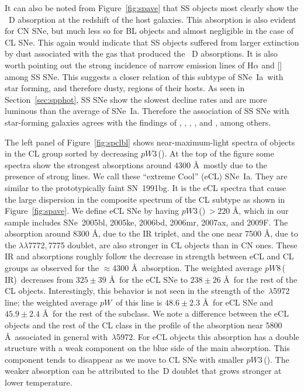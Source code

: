 \documentclass[apj]{emulateapj-rtx4}
\newcommand{\ew}{$pW$}
\newcommand{\pwthree}{$pW$3\,(\ion{Mg}{2})}
\newcommand{\pweight}{$pW$8\,(\ion{Ca}{2}\,IR)}
\newcommand{\sneia}{SNe~Ia}
\begin{document}
It can also be noted from Figure~\ref{fig:spave} that SS objects most
clearly show the ~D absorption at the redshift of the host
galaxies. This absorption is also evident for CN SNe, but much less so for BL
objects and almost negligible in the case of CL SNe. This again would
indicate that SS objects suffered from larger extinction by dust
associated with the gas that produced the ~D absorptions.
It is also worth pointing out the strong incidence of narrow emission
lines of H$\alpha$ and [] among SS SNe. This suggests a
closer relation of this subtype of \sneia\ with star forming,
and therefore dusty, regions of their hosts. As seen in
Section~\ref{sec:spphot}, SS SNe show the slowest decline rates and
are more luminous than the average of \sneia. Therefore the
association of SS SNe with star-forming galaxies agrees with the
findings of \citet{hamuy96}, \citet{howell01}, \citet{gallagher08},
\citet{hicken09}, \citet{sullivan10} and \citet{brandt11}, among others.

The left panel of Figure~\ref{fig:spclbl} shows near-maximum-light
spectra of objects in the CL group sorted by decreasing \pwthree. At the
top of the figure some spectra show the strongest absorptions around
4300 \AA\ mostly due to the presence of strong  lines.
We call these ``extreme Cool'' (eCL) \sneia. They are similar to
the prototypically faint SN~1991bg. It is the eCL spectra that cause
the large dispersion in the composite spectrum of the CL subtype as
shown in Figure~\ref{fig:spave}. We define eCL SNe by having
\pwthree\,$>220$ \AA, which in our sample includes SNe~2005bl, 2005ke,
2006bd, 2006mr, 2007ax, and 2009F. The absorption around 8300
\AA, due to the  IR triplet, and the one near 7500 \AA, due to the
 $\lambda\lambda$7772,\,7775 doublet, are also stronger in CL
objects than in CN ones. These  IR and 
absorptions roughly follow the decrease in strength between eCL and CL
groups as observed for the $\approx$4300 \AA\ absorption. The weighted
average \pweight\ decreases from $325\pm39$ \AA\ for the eCL SNe 
to $238\pm26$ \AA\ for the rest of the CL objects. Interestingly, this
behavior is not seen in the strength of the \,$\lambda$5972
line; the weighted average \ew\ of this line is $48.6\pm2.3$
\AA\ for eCL SNe and $45.9\pm2.4$ \AA\ for the rest of the
subclass. We note a difference between the eCL objects and the rest
of the CL class in the profile of the absorption near 5800 \AA\ associated
in general with \,$\lambda$5972. For eCL objects this
absorption has a double structure with a weak component on the blue
side of the main absorption. This component tends to disappear as we
move to CL SNe with smaller \pwthree. The weaker absorption
can be attributed to the \,D doublet that grows
stronger at lower temperature.
\end{document}
